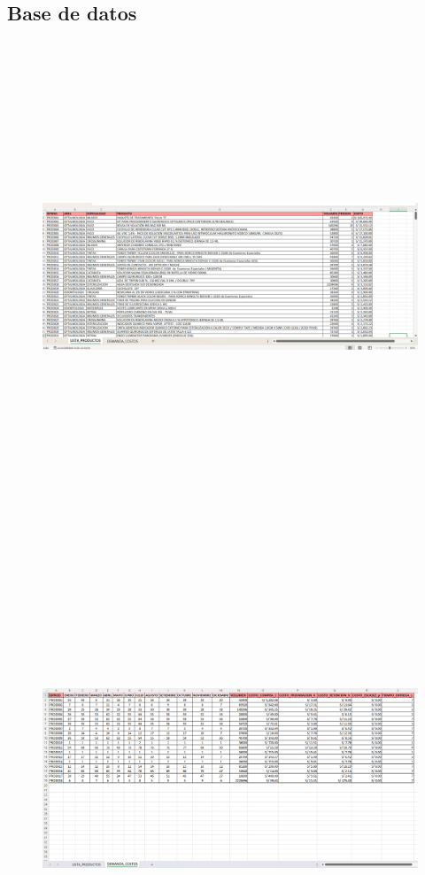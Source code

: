 \clearpage
\begin{landscape}
\section{Base de datos}
\begin{figure}[h!]
  {\includegraphics[width=24cm, height=14cm]{images/datos1.png}}
\end{figure}

\begin{figure}[h!]
  {\includegraphics[width=24cm, height=15cm]{images/datos2.png}}
\end{figure}
\end{landscape}

